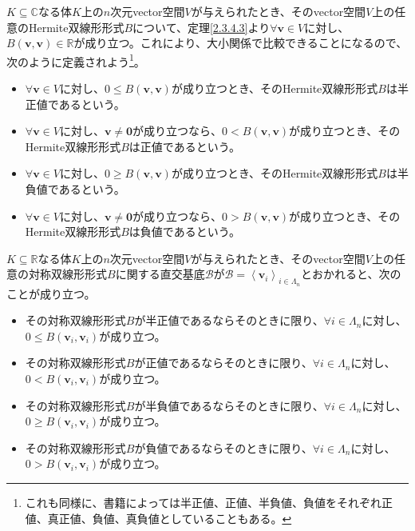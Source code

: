 \documentclass[dvipdfmx]{jsarticle}
\begin{document}
\begin{dfn}
$K \subseteq \mathbb{C}$なる体$K$上の$n$次元vector空間$V$が与えられたとき、そのvector空間$V$上の任意のHermite双線形形式$B$について、定理\ref{2.3.4.3}より$\forall\mathbf{v} \in V$に対し、$B\left( \mathbf{v},\mathbf{v} \right) \in \mathbb{R}$が成り立つ。これにより、大小関係で比較できることになるので、次のように定義されよう\footnote{これも同様に、書籍によっては半正値、正値、半負値、負値をそれぞれ正値、真正値、負値、真負値としていることもある。}。
\begin{itemize}
\item
  $\forall\mathbf{v} \in V$に対し、$0 \leq B\left( \mathbf{v},\mathbf{v} \right)$が成り立つとき、そのHermite双線形形式$B$は半正値であるという。
\item
  $\forall\mathbf{v} \in V$に対し、$\mathbf{v} \neq \mathbf{0}$が成り立つなら、$0 < B\left( \mathbf{v},\mathbf{v} \right)$が成り立つとき、そのHermite双線形形式$B$は正値であるという。
\item
  $\forall\mathbf{v} \in V$に対し、$0 \geq B\left( \mathbf{v},\mathbf{v} \right)$が成り立つとき、そのHermite双線形形式$B$は半負値であるという。
\item
  $\forall\mathbf{v} \in V$に対し、$\mathbf{v} \neq \mathbf{0}$が成り立つなら、$0 > B\left( \mathbf{v},\mathbf{v} \right)$が成り立つとき、そのHermite双線形形式$B$は負値であるという。
\end{itemize}
\end{dfn}
\begin{thm}\label{2.3.5.17}
$K \subseteq \mathbb{R}$なる体$K$上の$n$次元vector空間$V$が与えられたとき、そのvector空間$V$上の任意の対称双線形形式$B$に関する直交基底$\mathcal{B}$が$\mathcal{B} =\left\langle \mathbf{v}_{i} \right\rangle_{i \in \varLambda_{n}}$とおかれると、次のことが成り立つ。
\begin{itemize}
\item
  その対称双線形形式$B$が半正値であるならそのときに限り、$\forall i \in \varLambda_{n}$に対し、$0 \leq B\left( \mathbf{v}_{i},\mathbf{v}_{i} \right)$が成り立つ。
\item
  その対称双線形形式$B$が正値であるならそのときに限り、$\forall i \in \varLambda_{n}$に対し、$0 < B\left( \mathbf{v}_{i},\mathbf{v}_{i} \right)$が成り立つ。
\item
  その対称双線形形式$B$が半負値であるならそのときに限り、$\forall i \in \varLambda_{n}$に対し、$0 \geq B\left( \mathbf{v}_{i},\mathbf{v}_{i} \right)$が成り立つ。
\item
  その対称双線形形式$B$が負値であるならそのときに限り、$\forall i \in \varLambda_{n}$に対し、$0 > B\left( \mathbf{v}_{i},\mathbf{v}_{i} \right)$が成り立つ。
\end{itemize}
\end{thm}
\end{document}
